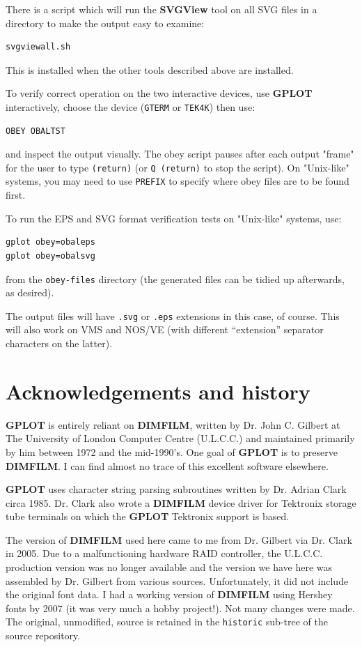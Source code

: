 \documentclass[a4paper,twoside,11pt]{article}
\newcommand{\newpara}{\par\vspace{4mm}\noindent}
\begin{document}
\newpara
There is a script which will run the \textbf{SVGView} tool on all SVG
files in a directory to make the output easy to examine:
\begin{lstlisting}
svgviewall.sh
\end{lstlisting}
This is installed when the other tools described above are
installed.

\newpara
To verify correct operation on the two interactive devices,
use \textbf{GPLOT} interactively, choose the device
(\texttt{GTERM} or \texttt{TEK4K}) then use:
\begin{lstlisting}
OBEY OBALTST
\end{lstlisting}
and inspect the output visually. The obey script pauses
after each output "frame" for the user to type \texttt{(return)}
(or \texttt{Q (return)} to stop the script). On "Unix-like"
systems, you may need to use \texttt{PREFIX} to specify where obey
files are to be found first.

\newpara
To run the EPS and SVG format verification tests on
"Unix-like" systems, use:
\begin{lstlisting}
gplot obey=obaleps
gplot obey=obalsvg
\end{lstlisting}
from the \texttt{obey-files} directory (the generated
files can be tidied
up afterwards, as desired).

\newpara
The output files will have \texttt{.svg} or \texttt{.eps} extensions in 
this case, of course. This will also work on VMS and NOS/VE (with different
``extension'' separator characters on the latter).



\section{Acknowledgements and history}
\newpara
\textbf{GPLOT} is entirely reliant on \textbf{DIMFILM}, written by Dr. John C. Gilbert at The University of London
Computer Centre (U.L.C.C.) and maintained primarily by him between 1972 and the mid-1990's. One goal of \textbf{GPLOT} is to
preserve \textbf{DIMFILM}. I can find almost no trace of this excellent software elsewhere.

\newpara
\textbf{GPLOT} uses character
string parsing subroutines written by Dr. Adrian Clark circa 1985. Dr. Clark also wrote a \textbf{DIMFILM} device
driver for Tektronix storage tube terminals on which the \textbf{GPLOT} Tektronix support
is based.

\newpara
The version of \textbf{DIMFILM} used here came to me from Dr. Gilbert via Dr. Clark in 2005. Due to a malfunctioning hardware
RAID controller, the U.L.C.C. production version was no longer available and the version we have here
was assembled by Dr. Gilbert from various sources. Unfortunately, it did not include the original font data. I had a
working version of \textbf{DIMFILM} using Hershey fonts by 2007 (it was very much a hobby project!). Not many changes were made.
The original, unmodified, source is retained in the \texttt{historic} sub-tree of the source repository.
\end{document}
